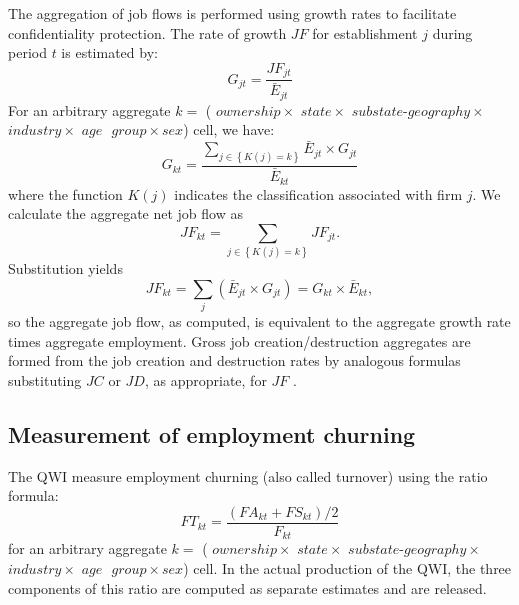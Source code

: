 The aggregation of job flows is performed using growth rates to facilitate
confidentiality protection. The rate of growth $JF$ for establishment $j$
during period $t$ is estimated by:%
\begin{equation}
G_{jt}=\frac{{JF_{jt}}}{{\bar{E}_{jt}}}
\end{equation}%
For an arbitrary aggregate $k=$ ( $ownership\times$ $state\times$ $substate%
\text{-}geography\times$ $industry\times$ $age\text{ }group\times sex$)
cell, we have:%
\begin{equation}
G_{kt}=\frac{\sum\limits_{j\in \left\{ {K(j)=k}\right\} }{\bar{E}_{jt}\times
G_{jt}}}{\bar{E}_{kt}}
\end{equation}%
where the function $K(j)$ indicates the classification associated with firm $%
j$. We calculate the aggregate net job flow as%
\begin{equation}
JF_{kt}=\sum\limits_{j\in \left\{ {K(j)=k}\right\} }{JF_{jt}}.
\end{equation}%
Substitution yields%
\begin{equation}
JF_{kt}=\sum\limits_{j}{(\bar{E}_{jt}\times G_{jt})}=G_{kt}\times \bar{E}%
_{kt},
\end{equation}%
so the aggregate job flow, as computed, is equivalent to the aggregate
growth rate times aggregate employment. Gross job creation/destruction
aggregates are formed from the job creation and destruction rates by
analogous formulas substituting $JC$ or $JD$, as appropriate, for $JF$ \cite[%
p. 189 for details]{DavisHaltiwangerSchuh}.

\subsection{Measurement of employment churning}

\label{sec:churning}

The QWI measure employment churning (also called turnover) using the ratio
formula:%
\begin{equation}
FT_{kt}=\frac{\left( FA_{kt}+FS_{kt}\right) /2}{F_{kt}}
\end{equation}%
for an arbitrary aggregate $k=$ ( $ownership\times$ $state\times$ $substate%
\text{-}geography\times$ $industry\times$ $age\text{ }group\times sex$) 
cell. In the actual production of the QWI, the three components of this
ratio are computed as separate estimates and are released.

